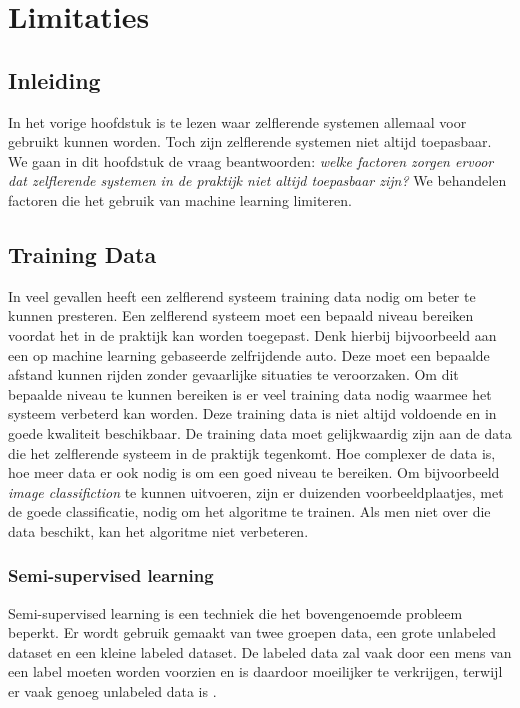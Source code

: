 \section{Limitaties}

\subsection{Inleiding}
In het vorige hoofdstuk is te lezen waar zelflerende systemen allemaal voor gebruikt kunnen worden. Toch zijn zelflerende systemen niet altijd toepasbaar. We gaan in dit hoofdstuk de vraag beantwoorden: \textit{welke factoren zorgen ervoor dat zelflerende systemen in de praktijk niet altijd toepasbaar zijn?} We behandelen factoren die het gebruik van machine learning limiteren. 

\subsection{Training Data}
In  veel gevallen heeft een zelflerend systeem training data nodig om beter te kunnen presteren. Een zelflerend systeem moet een bepaald niveau bereiken voordat het in de praktijk kan worden toegepast. Denk hierbij bijvoorbeeld aan een op machine learning gebaseerde zelfrijdende auto. Deze moet een bepaalde afstand kunnen rijden zonder gevaarlijke situaties te veroorzaken. Om dit bepaalde niveau te kunnen bereiken is er veel training data nodig waarmee het systeem verbeterd kan worden. Deze training data is niet altijd voldoende en in goede kwaliteit beschikbaar. De training data moet gelijkwaardig zijn aan de data die het zelflerende systeem in de praktijk tegenkomt. Hoe complexer de data is, hoe meer data er ook nodig is om een goed niveau te bereiken. Om bijvoorbeeld \textit{image classifiction} te kunnen uitvoeren, zijn er duizenden voorbeeldplaatjes, met de goede classificatie, nodig om het algoritme te trainen. Als men niet over die data beschikt, kan het algoritme niet verbeteren. 

\subsubsection{Semi-supervised learning}
Semi-supervised learning is een techniek die het bovengenoemde probleem beperkt. Er wordt gebruik gemaakt van twee groepen data, een grote unlabeled dataset en een kleine labeled dataset. De labeled data zal vaak door een mens van een label moeten worden voorzien en is daardoor moeilijker te verkrijgen, terwijl er vaak genoeg unlabeled data is \cite{SemiSupervisedLearning}.

